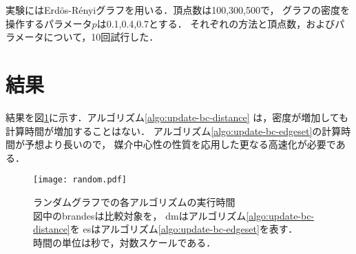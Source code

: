 \documentclass{jarticle}
\begin{document}
実験にはErd\"{o}s-R\'{e}nyiグラフを用いる．頂点数は100,300,500で，
グラフの密度を操作するパラメータ$p$は0.1,0.4,0.7とする．
それぞれの方法と頂点数，およびパラメータについて，10回試行した．

\section{結果}
結果を図\ref{fig:exp-random}に示す．アルゴリズム\ref{algo:update-bc-distance}
は，密度が増加しても計算時間が増加することはない．
アルゴリズム\ref{algo:update-bc-edgeset}の計算時間が予想より長いので，
媒介中心性の性質を応用した更なる高速化が必要である．

\begin{figure}
  \centering
  \texttt{[image: random.pdf]}
  \captionsetup{justification=centering}
  \caption{ランダムグラフでの各アルゴリズムの実行時間 \\
    {\footnotesize 図中のbrandesは比較対象を，
      dmはアルゴリズム\ref{algo:update-bc-distance}を
      esはアルゴリズム\ref{algo:update-bc-edgeset}を表す．} \\
    {\footnotesize 時間の単位は秒で，対数スケールである．}
  }
  \label{fig:exp-random}
\end{figure}
\end{document}
